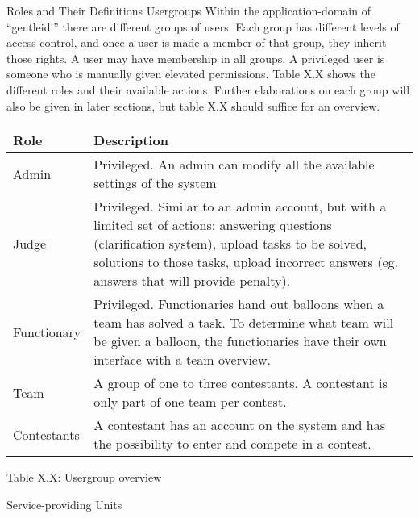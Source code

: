 Roles and Their Definitions
Usergroups
Within the application-domain of
``gentleidi'' there are different
groups of users. Each group has different levels of access control, and
once a user is made a member of that group, they inherit those rights.
A user may have membership in all groups. A privileged user is someone
who is manually given elevated permissions. Table X.X shows the
different roles and their available actions. Further elaborations on
each group will also be given in later sections, but table X.X should
suffice for an overview.

\begin{table}
\tablehead{}
\begin{supertabular}{|m{0.2\textwidth}|m{0.8\textwidth}|}
\hline
Role &
Description\\\hline
Admin &
Privileged. An admin can modify all the available settings of the
system\\\hline
Judge &
Privileged. Similar to an admin account, but with a limited set of
actions: answering questions (clarification system), upload tasks to be
solved, solutions to those tasks, upload incorrect answers (eg. answers
that will provide penalty).\\\hline
Functionary &
Privileged. Functionaries hand out balloons when a team has solved a
task. To determine what team will be given a balloon, the functionaries
have their own interface with a team overview.\\\hline
Team &
A group of one to three contestants. A contestant is only part of one
team per contest. \\\hline
Contestants &
A contestant has an account on the system and has the possibility to
enter and compete in a contest. \\\hline
\end{supertabular}
\end{table}
Table X.X: Usergroup overview

Service-providing Units

